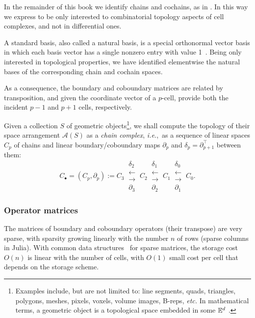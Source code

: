 {In the remainder of this book we identify chains  and cochains, as in \cite{PAOLUZZI2023103436}.
In this way we express to be only interested to combinatorial topology aspects of cell complexes, and not in differential ones. 

A standard basis, also called a natural basis, is a special orthonormal vector basis in which each basis vector has a single nonzero entry with value 1~\cite{Wolfram:algebra:StandardBasis}.
Being only interested in topological properties, we have identified elementwise the natural bases of the corresponding chain and cochain spaces. 

As a consequence, the boundary and coboundary matrices are related by transposition, and given the coordinate vector of a $p$-cell, provide both the incident $p-1$ and $p+1$ cells, respectively.

Given a collection \(\mathit{S}\) of geometric
objects\footnote{Examples include, but are not limited to: line segments, quads, triangles, polygons, meshes, pixels, voxels, volume images, B-reps, \emph{etc.} 
In mathematical terms, a geometric object is a topological space embedded in some $\mathbb{E}^d$ \cite{Edelsbrunner:95}.},
we shall compute the topology of their space
arrangement \(\mathcal{A}(\mathit{S})\) as a \emph{chain complex},
\emph{i.e.},~as a sequence of linear spaces \(C_p\) of chains and linear
boundary/coboundary maps \(\partial_p\) and
\(\delta_p=\partial_{p+1}^\top\) between them: 
\[ 
C_\bullet = (C_p, \partial_p) := 
C_3 \ 
\substack{
\delta_2 \\
\longleftarrow \\[-1mm]
\longrightarrow \\
\partial_3 
}
\ C_2 \ 
\substack{
\delta_1 \\
\longleftarrow \\[-1mm]
\longrightarrow \\
\partial_2 
}
\ C_1 \ 
\substack{
\delta_0 \\
\longleftarrow \\[-1mm]
\longrightarrow \\
\partial_1 
}
\ C_0 .
\] 





\subsubsection*{Operator matrices}

The matrices of boundary and coboundary operators (their transpose) are very
sparse, with sparsity growing linearly with the number $n$ of rows (sparse columns in Julia).  With common data structures~\cite{coosparse} for sparse matrices, 
the storage cost $O(n)$ is linear with the number of cells, with $O(1)$ small cost per cell  that depends on the storage scheme.

}
